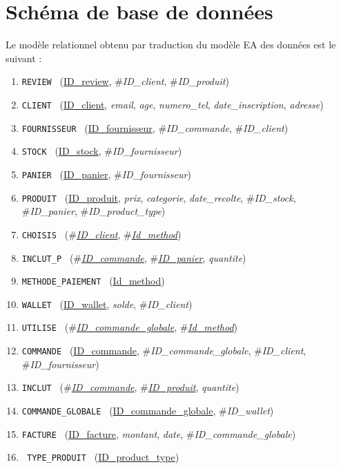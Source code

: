 \documentclass[a4paper,12pt]{book}
\newcommand{\attr}[1]{\emph{#1}}
\newcommand{\texit}[1]{\#\textsl{#1}}
\theoremstyle{break}
\theoremstyle{break}
\theoremstyle{break}
\theoremstyle{break}
\theoremstyle{definition}
\theoremstyle{remark}
\begin{document}
\section{Schéma de base de données}
Le modèle relationnel obtenu par traduction du modèle EA des données est le suivant :
\begin{enumerate}

  \item { \texttt{REVIEW } (\underline{ID\_review}, \texit{ID\_client}, \texit{ID\_produit}) }
  \item { \texttt{CLIENT } (\underline{ID\_client}, \attr{email}, \attr{age}, \attr{numero\_tel}, \attr{date\_inscription}, \attr{adresse}) }
  \item { \texttt{FOURNISSEUR } (\underline{ID\_fournisseur}, \texit{ID\_commande}, \texit{ID\_client}) }
  \item { \texttt{STOCK } (\underline{ID\_stock}, \texit{ID\_fournisseur}) }
  \item { \texttt{PANIER } (\underline{ID\_panier}, \texit{ID\_fournisseur}) }
  \item { \texttt{PRODUIT } (\underline{ID\_produit}, \attr{prix}, \attr{categorie}, \attr{date\_recolte}, \texit{ID\_stock}, \texit{ID\_panier}, \texit{ID\_product\_type}) }
  \item { \texttt{CHOISIS } (\texit{\underline{ID\_client}}, \texit{\underline{Id\_method}}) }
  \item { \texttt{INCLUT\_P } (\texit{\underline{ID\_commande}}, \texit{\underline{ID\_panier}}, \attr{quantite}) }
  \item { \texttt{METHODE\_PAIEMENT } (\underline{Id\_method}) }
  \item { \texttt{WALLET } (\underline{ID\_wallet}, \attr{solde}, \texit{ID\_client}) }
  \item { \texttt{UTILISE } (\texit{\underline{ID\_commande\_globale}}, \texit{\underline{Id\_method}}) }
  \item { \texttt{COMMANDE } (\underline{ID\_commande}, \texit{ID\_commande\_globale}, \texit{ID\_client}, \texit{ID\_fournisseur}) }
  \item { \texttt{INCLUT } (\texit{\underline{ID\_commande}}, \texit{\underline{ID\_produit}}, \attr{quantite}) }
  \item { \texttt{COMMANDE\_GLOBALE } (\underline{ID\_commande\_globale}, \texit{ID\_wallet}) }
  \item { \texttt{FACTURE } (\underline{ID\_facture}, \attr{montant}, \attr{date}, \texit{ID\_commande\_globale}) }
 \item{ \texttt{ TYPE\_PRODUIT } (\underline{ID\_product\_type})}
\end{enumerate}
\end{document}
